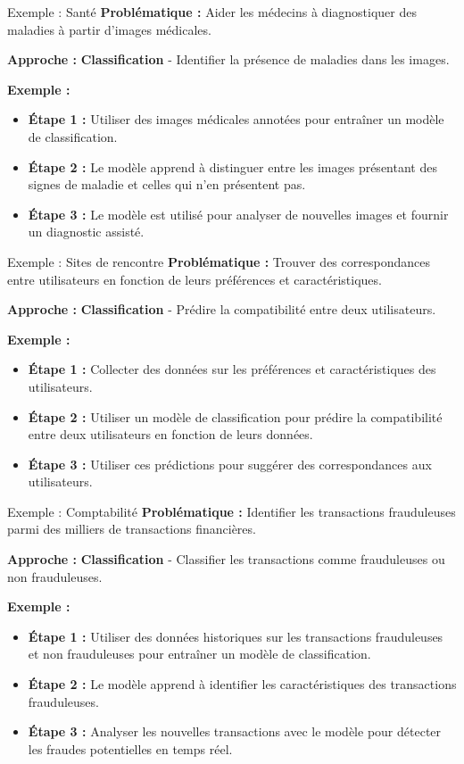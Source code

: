 \begin{frame}{Exemple : Santé}
    \textbf{Problématique :}
    Aider les médecins à diagnostiquer des maladies à partir d'images médicales.

    \textbf{Approche :}
    \textbf{Classification} - Identifier la présence de maladies dans les images.

    \textbf{Exemple :}
    \begin{itemize}
    \item \textbf{Étape 1 :} Utiliser des images médicales annotées
      pour entraîner un modèle de classification.
  \item \textbf{Étape 2 :} Le modèle apprend à distinguer entre les
    images présentant des signes de maladie et celles qui n'en
    présentent pas.
  \item \textbf{Étape 3 :} Le modèle est utilisé pour analyser de
    nouvelles images et fournir un diagnostic assisté.
  \end{itemize}
\end{frame}

\begin{frame}{Exemple : Sites de rencontre}
    \textbf{Problématique :}
    Trouver des correspondances entre utilisateurs en fonction de leurs préférences et caractéristiques.

    \textbf{Approche :}
    \textbf{Classification} - Prédire la compatibilité entre deux utilisateurs.

    \textbf{Exemple :}
  \begin{itemize}
  \item \textbf{Étape 1 :} Collecter des données sur les préférences et
    caractéristiques des utilisateurs.
  \item \textbf{Étape 2 :} Utiliser un modèle de classification pour
    prédire la compatibilité entre deux utilisateurs en fonction de
    leurs données.
  \item \textbf{Étape 3 :} Utiliser ces prédictions pour suggérer des
    correspondances aux utilisateurs.
  \end{itemize}
\end{frame}

\begin{frame}{Exemple : Comptabilité}
  \textbf{Problématique :} Identifier les transactions frauduleuses
  parmi des milliers de transactions financières.

  \textbf{Approche :} \textbf{Classification} - Classifier les
  transactions comme frauduleuses ou non frauduleuses.

  \textbf{Exemple :}
  \begin{itemize}
  \item \textbf{Étape 1 :} Utiliser des données historiques sur les
    transactions frauduleuses et non frauduleuses pour entraîner un
    modèle de classification.
  \item \textbf{Étape 2 :} Le modèle apprend à identifier les
    caractéristiques des transactions frauduleuses.
  \item \textbf{Étape 3 :} Analyser les nouvelles transactions avec le
    modèle pour détecter les fraudes potentielles en temps réel.
  \end{itemize}
\end{frame}

